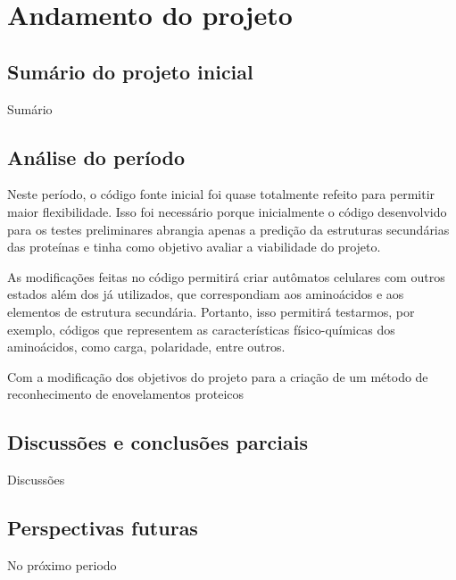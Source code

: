 \chapter{Andamento do projeto}\label{ch:introducao}
\section{Sumário do projeto inicial}
Sumário
\section{Análise do período}
Neste período, o código fonte inicial foi quase totalmente refeito para permitir maior flexibilidade. Isso foi necessário porque inicialmente o código desenvolvido para os testes preliminares abrangia apenas a predição da estruturas secundárias das proteínas e tinha como objetivo avaliar a viabilidade do projeto. 

As modificações feitas no código permitirá criar autômatos celulares com outros estados além dos já utilizados, que correspondiam aos aminoácidos e aos elementos de estrutura secundária. Portanto, isso permitirá testarmos, por exemplo, códigos que representem as características físico-químicas dos aminoácidos, como carga, polaridade, entre outros.



Com a modificação dos objetivos do projeto para a criação de um método de reconhecimento de enovelamentos proteicos
\section{Discussões e conclusões parciais}
Discussões 
\section{Perspectivas futuras}
No próximo periodo
